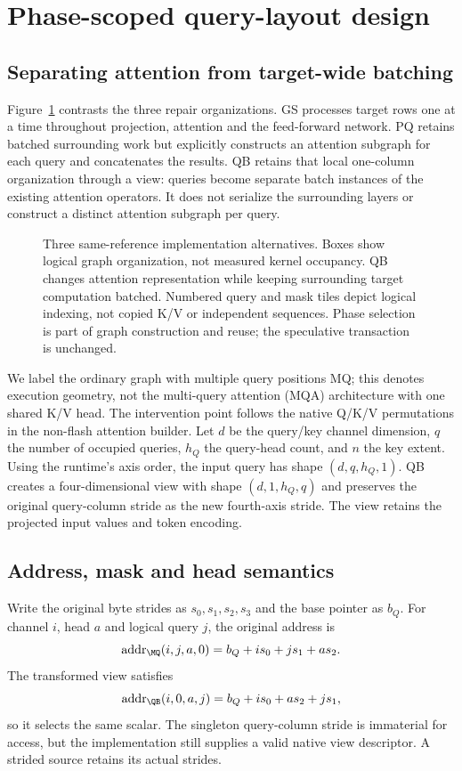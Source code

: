 \section{Phase-scoped query-layout design}
\label{sec:method}
\subsection{Separating attention from target-wide batching}
Figure~\ref{fig:design} contrasts the three repair organizations. GS processes target rows one at a time throughout projection, attention and the feed-forward network. PQ retains batched surrounding work but explicitly constructs an attention subgraph for each query and concatenates the results. QB retains that local one-column organization through a view: queries become separate batch instances of the existing attention operators. It does not serialize the surrounding layers or construct a distinct attention subgraph per query.

\begin{figure}[t]
\centering
\caption{Three same-reference implementation alternatives. Boxes show logical graph organization, not measured kernel occupancy. QB changes attention representation while keeping surrounding target computation batched. Numbered query and mask tiles depict logical indexing, not copied K/V or independent sequences. Phase selection is part of graph construction and reuse; the speculative transaction is unchanged.}
\label{fig:design}
\end{figure}

We label the ordinary graph with multiple query positions MQ; this denotes execution geometry, not the multi-query attention (MQA) architecture with one shared K/V head. The intervention point follows the native Q/K/V permutations in the non-flash attention builder. Let $d$ be the query/key channel dimension, $q$ the number of occupied queries, $h_Q$ the query-head count, and $n$ the key extent. Using the runtime's axis order, the input query has shape $(d,q,h_Q, 1)$. QB creates a four-dimensional view with shape $(d, 1,h_Q,q)$ and preserves the original query-column stride as the new fourth-axis stride. The view retains the projected input values and token encoding.

\subsection{Address, mask and head semantics}
Write the original byte strides as $s_0,s_1,s_2,s_3$ and the base pointer as $b_Q$. For channel $i$, head $a$ and logical query $j$, the original address is
\begin{equation}
\operatorname{addr}_{\MQ}(i,j,a, 0)=b_Q+i s_0+j s_1+a s_2.
\end{equation}
The transformed view satisfies
\begin{equation}
\operatorname{addr}_{\QB}(i, 0,a,j)=b_Q+i s_0+a s_2+j s_1,
\label{eq:address}
\end{equation}
so it selects the same scalar. The singleton query-column stride is immaterial for access, but the implementation still supplies a valid native view descriptor. A strided source retains its actual strides.

